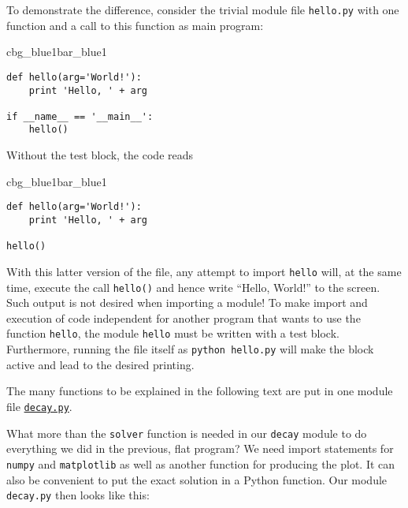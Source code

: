 \documentclass[graybox,sectrefs,envcountresetchap,open=right,final]{svmonodo}
\newenvironment{_pro_tight}[2]{
   \def\FrameCommand{\color{#2}\vrule width 1mm\normalcolor\colorbox{#1}}
   \FrameRule0.6pt\MakeFramed {\advance\hsize-2mm\FrameRestore}\vskip3mm}
   {\vskip0mm\endMakeFramed}
\newenvironment{pro}[2]{
\bgroup\rmfamily
\fboxsep=0mm\relax
\begin{_pro_tight}{#1}{#2}
\list{}{\parsep=-2mm\parskip=0mm\topsep=0pt\leftmargin=2mm
\rightmargin=2\leftmargin\leftmargin=4pt\relax}
\item\relax}
{\endlist\end{_pro_tight}\egroup}
\newenvironment{notice_mdfboxadmon}[1][]{
\begin{notice_mdfboxmdframed}[frametitle=#1]
}
{
\end{notice_mdfboxmdframed}
}
\begin{document}
To demonstrate the difference, consider the trivial module
file \texttt{hello.py} with one function and a call to this function as main program:

\begin{pro}{cbg_blue1}{bar_blue1}\begin{Verbatim}[numbers=none,fontsize=\fontsize{9pt}{9pt},baselinestretch=0.95,xleftmargin=2mm]
def hello(arg='World!'):
    print 'Hello, ' + arg

if __name__ == '__main__':
    hello()
\end{Verbatim}
\end{pro}
\noindent
Without the test block, the code reads

\begin{pro}{cbg_blue1}{bar_blue1}\begin{Verbatim}[numbers=none,fontsize=\fontsize{9pt}{9pt},baselinestretch=0.95,xleftmargin=2mm]
def hello(arg='World!'):
    print 'Hello, ' + arg

hello()
\end{Verbatim}
\end{pro}
\noindent
With this latter version of the file, any attempt to import \texttt{hello}
will, at the same time, execute the call \texttt{hello()} and hence write
``Hello, World!'' to the screen.  Such output is not desired when
importing a module!  To make import and execution of code independent
for another program that wants to use the function \texttt{hello}, the module
\texttt{hello} must be written with a test block. Furthermore, running the
file itself as \texttt{python hello.py} will make the block active and lead
to the desired printing.


\begin{notice_mdfboxadmon}
The many functions to be explained in the following text are
put in one module file \href{{http://tinyurl.com/ofkw6kc/softeng/decay.py}}{\nolinkurl{decay.py}}.
\end{notice_mdfboxadmon}



What more than the \texttt{solver} function is needed in our \texttt{decay} module
to do everything we did in the previous, flat program?  We need import
statements for \texttt{numpy} and \texttt{matplotlib} as well as another function
for producing the plot. It can also be convenient to put the exact
solution in a Python function.  Our module \texttt{decay.py} then looks like
this:
\end{document}
